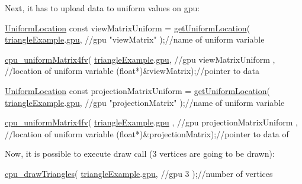 Next, it has to upload data to uniform values on gpu\+: 
\begin{DoxyCodeInclude}
  \hyperlink{uniforms_8h_a0827d09b4e6a18f2718775e7e9289fbd}{UniformLocation} \textcolor{keyword}{const} viewMatrixUniform = \hyperlink{uniforms_8h_a6ea94982618b1c339a97a528b0670a53}{getUniformLocation}(
      \hyperlink{triangleExample_8c_af82b723635ac0c90962571915a1b1163}{triangleExample}.\hyperlink{structTriangleExampleVariables_a6c5c3f82065ae9aac07f9e6f11dd03b3}{gpu}, \textcolor{comment}{//gpu}
      \textcolor{stringliteral}{"viewMatrix"}       );\textcolor{comment}{//name of uniform variable}

  \hyperlink{uniforms_8h_a44cfae8c541efcc181e3947511df7f7a}{cpu\_uniformMatrix4fv}(
      \hyperlink{triangleExample_8c_af82b723635ac0c90962571915a1b1163}{triangleExample}.\hyperlink{structTriangleExampleVariables_a6c5c3f82065ae9aac07f9e6f11dd03b3}{gpu}, \textcolor{comment}{//gpu}
      viewMatrixUniform  , \textcolor{comment}{//location of uniform variable}
      (\textcolor{keywordtype}{float}*)&viewMatrix);\textcolor{comment}{//pointer to data}

  \hyperlink{uniforms_8h_a0827d09b4e6a18f2718775e7e9289fbd}{UniformLocation} \textcolor{keyword}{const} projectionMatrixUniform = 
      \hyperlink{uniforms_8h_a6ea94982618b1c339a97a528b0670a53}{getUniformLocation}(
      \hyperlink{triangleExample_8c_af82b723635ac0c90962571915a1b1163}{triangleExample}.\hyperlink{structTriangleExampleVariables_a6c5c3f82065ae9aac07f9e6f11dd03b3}{gpu}, \textcolor{comment}{//gpu}
      \textcolor{stringliteral}{"projectionMatrix"} );\textcolor{comment}{//name of uniform variable}

  \hyperlink{uniforms_8h_a44cfae8c541efcc181e3947511df7f7a}{cpu\_uniformMatrix4fv}(
      \hyperlink{triangleExample_8c_af82b723635ac0c90962571915a1b1163}{triangleExample}.\hyperlink{structTriangleExampleVariables_a6c5c3f82065ae9aac07f9e6f11dd03b3}{gpu}      , \textcolor{comment}{//gpu}
      projectionMatrixUniform  , \textcolor{comment}{//location of uniform variable}
      (\textcolor{keywordtype}{float}*)&projectionMatrix);\textcolor{comment}{//pointer to data of}
\end{DoxyCodeInclude}
Now, it is possible to execute draw call (3 vertices are going to be drawn)\+: 
\begin{DoxyCodeInclude}
  \hyperlink{student__pipeline_8c_aa47deaa10ce52221ab24e864a11426af}{cpu\_drawTriangles}(
      \hyperlink{triangleExample_8c_af82b723635ac0c90962571915a1b1163}{triangleExample}.\hyperlink{structTriangleExampleVariables_a6c5c3f82065ae9aac07f9e6f11dd03b3}{gpu}, \textcolor{comment}{//gpu}
      3                  );\textcolor{comment}{//number of vertices}
\end{DoxyCodeInclude}
